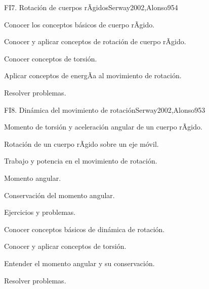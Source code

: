 \begin{syllabus}
\begin{unit}{FI7. Rotación de cuerpos rÃ­gidos}{Serway2002,Alonso95}{4}
   \begin{unitgoals}
      \item Conocer los conceptos básicos de cuerpo rÃ­gido.
      \item Conocer y aplicar conceptos de rotación de cuerpo rÃ­gido.
      \item Conocer conceptos de torsión.
      \item Aplicar conceptos de energÃ­a al movimiento de rotación.
      \item Resolver problemas.
   \end{unitgoals}
\end{unit}

\begin{unit}{FI8. Dinámica del movimiento de rotación}{Serway2002,Alonso95}{3}
\begin{topics}
      \item Momento de torsión y aceleración angular de un cuerpo rÃ­gido.
      \item Rotación de un cuerpo rÃ­gido sobre un eje móvil.
      \item Trabajo y potencia en el movimiento de rotación.
      \item Momento angular.
      \item Conservación del momento angular.
      \item Ejercicios y problemas.
    \end{topics}

   \begin{unitgoals}
      \item Conocer conceptos básicos de dinámica de rotación.
      \item Conocer y aplicar conceptos de torsión.
      \item Entender el momento angular y su conservación.
      \item Resolver problemas.
   \end{unitgoals}
\end{unit}

\begin{coursebibliography}
\end{coursebibliography}
\end{syllabus}

